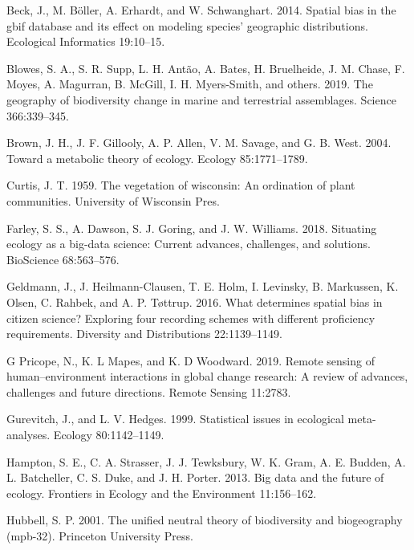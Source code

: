 \documentclass[
  12pt,
]{article}
\newlength{\cslhangindent}
\newenvironment{cslreferences}%
  {\setlength{\parindent}{0pt}%
  \everypar{\setlength{\hangindent}{\cslhangindent}}\ignorespaces}%
  {\par}
\begin{document}
\hypertarget{refs}{}
\begin{cslreferences}
\leavevmode\hypertarget{ref-beck2014spatial}{}%
Beck, J., M. Böller, A. Erhardt, and W. Schwanghart. 2014. Spatial bias in the gbif database and its effect on modeling species' geographic distributions. Ecological Informatics 19:10--15.

\leavevmode\hypertarget{ref-blowes2019geography}{}%
Blowes, S. A., S. R. Supp, L. H. Antão, A. Bates, H. Bruelheide, J. M. Chase, F. Moyes, A. Magurran, B. McGill, I. H. Myers-Smith, and others. 2019. The geography of biodiversity change in marine and terrestrial assemblages. Science 366:339--345.

\leavevmode\hypertarget{ref-brown2004toward}{}%
Brown, J. H., J. F. Gillooly, A. P. Allen, V. M. Savage, and G. B. West. 2004. Toward a metabolic theory of ecology. Ecology 85:1771--1789.

\leavevmode\hypertarget{ref-curtis1959vegetation}{}%
Curtis, J. T. 1959. The vegetation of wisconsin: An ordination of plant communities. University of Wisconsin Pres.

\leavevmode\hypertarget{ref-farley2018situating}{}%
Farley, S. S., A. Dawson, S. J. Goring, and J. W. Williams. 2018. Situating ecology as a big-data science: Current advances, challenges, and solutions. BioScience 68:563--576.

\leavevmode\hypertarget{ref-geldmann2016determines}{}%
Geldmann, J., J. Heilmann-Clausen, T. E. Holm, I. Levinsky, B. Markussen, K. Olsen, C. Rahbek, and A. P. Tøttrup. 2016. What determines spatial bias in citizen science? Exploring four recording schemes with different proficiency requirements. Diversity and Distributions 22:1139--1149.

\leavevmode\hypertarget{ref-g2019remote}{}%
G Pricope, N., K. L Mapes, and K. D Woodward. 2019. Remote sensing of human--environment interactions in global change research: A review of advances, challenges and future directions. Remote Sensing 11:2783.

\leavevmode\hypertarget{ref-gurevitch1999statistical}{}%
Gurevitch, J., and L. V. Hedges. 1999. Statistical issues in ecological meta-analyses. Ecology 80:1142--1149.

\leavevmode\hypertarget{ref-hampton2013big}{}%
Hampton, S. E., C. A. Strasser, J. J. Tewksbury, W. K. Gram, A. E. Budden, A. L. Batcheller, C. S. Duke, and J. H. Porter. 2013. Big data and the future of ecology. Frontiers in Ecology and the Environment 11:156--162.

\leavevmode\hypertarget{ref-hubbell2001unified}{}%
Hubbell, S. P. 2001. The unified neutral theory of biodiversity and biogeography (mpb-32). Princeton University Press.


\end{cslreferences}
\end{document}
